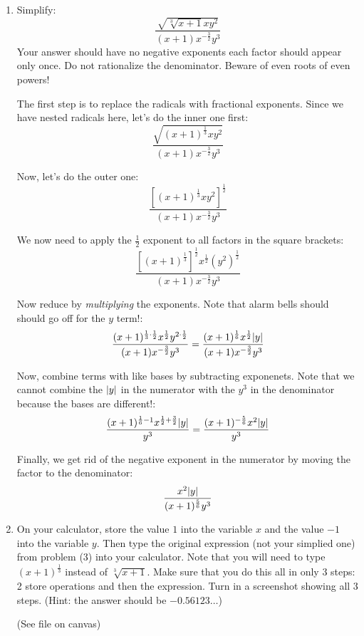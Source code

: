 \documentclass[letterpaper,12pt,fleqn]{article}
\begin{document}
\begin{enumerate}
\item Simplify:
  \[\frac{\sqrt{\sqrt[3]{x+1}xy^2}}{(x+1)x^{-\frac{3}{2}}y^3}\]
  Your answer should have no negative exponents each factor should appear
  only once. Do not rationalize the denominator. Beware of even roots of
  even powers!

  The first step is to replace the radicals with fractional exponents. Since
  we have nested radicals here, let's do the inner one first:
  \[\frac{\sqrt{(x+1)^{\frac{1}{3}}xy^2}}{(x+1)x^{-\frac{3}{2}}y^3}\]

  Now, let's do the outer one:
  \[\frac{[(x+1)^{\frac{1}{3}}xy^2]^{\frac{1}{2}}}{(x+1)x^{-\frac{3}{2}}y^3}\]

  We now need to apply the $\frac{1}{2}$ exponent to all factors in the square
  brackets:
  \[\frac{[(x+1)^{\frac{1}{3}}]^{\frac{1}{2}}x^{\frac{1}{2}}(y^2)^{\frac{1}{2}}}
         {(x+1)x^{-\frac{3}{2}}y^3}\]

  Now reduce by \emph{multiplying} the exponents. Note that alarm bells should
  should go off for the $y$ term!:
  \[\frac{(x+1)^{\frac{1}{3}\cdot\frac{1}{2}}x^{\frac{1}{2}}y^{2\cdot\frac{1}{2}}}
         {(x+1)x^{-\frac{3}{2}}y^3}=
  \frac{(x+1)^{\frac{1}{6}}x^{\frac{1}{2}}\lvert y\rvert}{(x+1)x^{-\frac{3}{2}}y^3}\]

  Now, combine terms with like bases by subtracting exponenets. Note that we
  cannot combine the $\lvert y\rvert$ in the numerator with the $y^3$ in the
  denominator because the bases are different!:
  \[\frac{(x+1)^{\frac{1}{6}-1}x^{\frac{1}{2}+\frac{3}{2}}\lvert y\rvert}{y^3}=
  \frac{(x+1)^{-\frac{5}{6}}x^2\lvert y\rvert}{y^3}\]

  Finally, we get rid of the negative exponent in the numerator by moving the
  factor to the denominator:
  \[\frac{x^2\lvert y\rvert}{(x+1)^{\frac{5}{6}}y^3}\]

\item On your calculator, store the value $1$ into the variable $x$ and the
  value $-1$ into the variable $y$. Then type the original expression (not
  your simplied one) from problem (3) into your calculator. Note that you will
  need to type $(x+1)^{\frac{1}{3}}$ instead of $\sqrt[3]{x+1}$. Make sure that
  you do this all in only 3 steps: 2 store operations and then the expression.
  Turn in a screenshot showing all 3 steps. (Hint: the answer should be
  $-0.56123\ldots$)

  (See file on canvas)
\end{enumerate}
\end{document}

